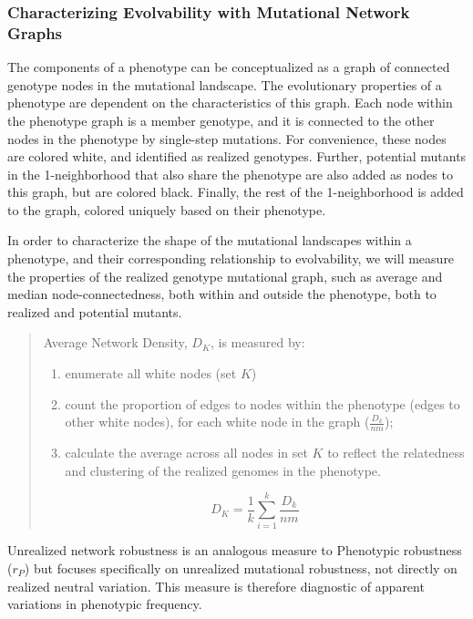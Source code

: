 \subsubsection{Characterizing Evolvability with Mutational Network Graphs}

The components of a phenotype can be conceptualized as a graph of connected genotype nodes in the mutational landscape. The evolutionary properties of a phenotype are dependent on the characteristics of this graph.  Each node within the phenotype graph is a member genotype, and it is connected to the other nodes in the phenotype by single-step mutations. For convenience, these nodes are colored white, and identified as realized genotypes. Further, potential mutants in the 1-neighborhood that also share the phenotype are also added as nodes to this graph, but are colored black. Finally, the rest of the 1-neighborhood is added to the graph, colored uniquely based on their phenotype. 

In order to characterize the shape of the mutational landscapes within a phenotype, and their corresponding relationship to evolvability, we will measure the properties of the realized genotype mutational graph, such as average and median node-connectedness, both within and outside the phenotype, both to realized and potential mutants. 
\begin{quote}


Average Network Density, $D_K$, is measured by:

\begin{enumerate}
\item enumerate all white nodes (set $K$)
\item count the proportion of edges to nodes within the phenotype (edges to other white nodes), for each white node in the graph ($\frac{D_k}{nm}$);
\item calculate the average across all nodes in set $K$ to reflect the relatedness and clustering of the realized genomes in the phenotype.
\end{enumerate}

\begin{equation}
D_{K} =  {\frac{1}{k} \sum_{i=1}^{k}}\frac{D_k}{nm} 
\end{equation}
\end{quote}

Unrealized network robustness is an analogous measure to Phenotypic robustness ($r_P$) but focuses specifically on unrealized mutational robustness, not directly on realized neutral variation. This measure is therefore diagnostic of apparent variations in phenotypic frequency. 

